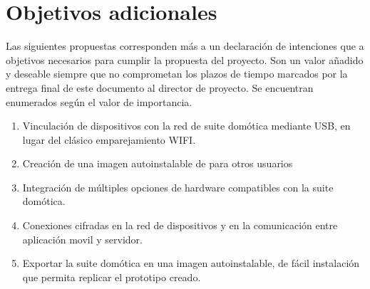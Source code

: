 \section{Objetivos adicionales}
\label{ch:Capitulo3.4}

Las siguientes propuestas corresponden más a un declaración de intenciones que a objetivos necesarios para cumplir la propuesta del proyecto. Son un valor añadido y deseable siempre que no comprometan los plazos de tiempo marcados por la entrega final de este documento al director de proyecto. Se encuentran enumerados según el valor de importancia.

\begin{enumerate}

  \item Vinculación de dispositivos con la red de suite domótica mediante USB, en lugar del clásico emparejamiento WIFI.

  \item Creación de una imagen autoinstalable de para otros usuarios

  \item Integración de múltiples opciones de hardware compatibles con la suite domótica.

  \item Conexiones cifradas en la red de dispositivos y en la comunicación entre aplicación movil y servidor.

  \item Exportar la suite domótica en una imagen autoinstalable, de fácil instalación que permita replicar el prototipo creado.

\end{enumerate}

